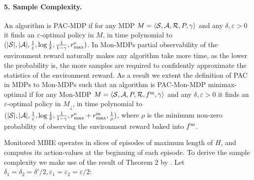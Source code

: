 \paragraph{5. Sample Complexity.}
An algorithm is PAC-MDP if for any MDP $M=\langle \mathcal{S}, \mathcal{A}, \mathcal{R}, P, \gamma \rangle$ and any $\delta, \varepsilon > 0$ it finds an $\varepsilon$-optimal policy in $M$, in time polynomial to $(|\mathcal{S}|, |\mathcal{A}|, \frac{1}{\varepsilon}, \log\frac{1}{\delta}, \frac{1}{1 - \gamma}, r_{\text{max}}^\text{e})$. In Mon-MDPs partial observability of the environment reward naturally makes any algorithm take more time, as the lower the probability is, the more samples are required to confidently approximate the statistics of the environment reward. As a result we extent the definition of PAC in MDPs to Mon-MDPs such that an algorithm is PAC-Mon-MDP minimax-optimal if for any Mon-MDP $M = \left\langle \mathcal{S}, \mathcal{A}, P, \mathcal{R}, f^\text{m}, \gamma \right\rangle$ and any $\delta, \varepsilon > 0$ it finds an $\varepsilon$-optimal policy in $M_{\downarrow}$, in time polynomial to $(|\mathcal{S}|, |\mathcal{A}|, \frac{1}{\varepsilon}, \log\frac{1}{\delta}, \frac{1}{1 - \gamma}, r_{\text{max}}^\text{e} + r_{\text{max}}^\text{m}, \frac{1}{\rho})$, where $\rho$ is the minimum non-zero probability of observing the environment reward baked into $f^\text{m}$.

Monitored MBIE operates in slices of episodes of maximum length of $H$, and computes its action-values at the beginning of each episode. To derive the sample complexity we make use of the result of Theorem 2 by \citet{strehl2008analysis}. Let $\delta_1 = \delta_2 = \delta' / 2, \varepsilon_1 = \varepsilon_2 = \varepsilon / 2$:

